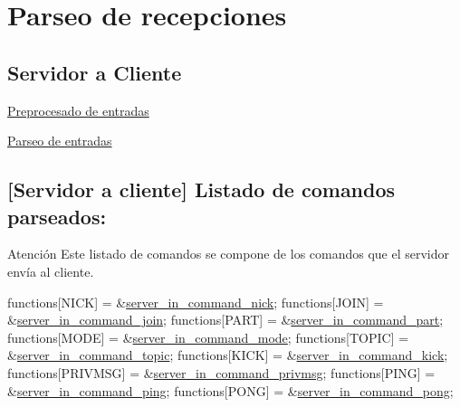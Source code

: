 \section*{Parseo de recepciones}

\subsection*{Servidor a Cliente}


\begin{DoxyItemize}
\item \hyperlink{client_pre_in_function}{Preprocesado de entradas} 
\item \hyperlink{client_execute_in_function}{Parseo de entradas} 
\end{DoxyItemize}\subsection*{\mbox{[}Servidor a cliente\mbox{]} Listado de comandos parseados\+:}

\begin{DoxyWarning}{Atención}
Este listado de comandos se compone de los comandos que el servidor envía al cliente.
\end{DoxyWarning}

\begin{DoxyCode}
functions[NICK]             = &\hyperlink{G-2313-06-P2__client__function__handlers_8h_a3271de16b2f7077059343bd6f52e4866}{server\_in\_command\_nick};
functions[JOIN]             = &\hyperlink{G-2313-06-P2__client__function__handlers_8h_a64c324e32edf01774722861d3abc7be3}{server\_in\_command\_join};
functions[PART]             = &\hyperlink{G-2313-06-P2__client__function__handlers_8h_a53568ffb9d2301140815861c2f7178ad}{server\_in\_command\_part};
functions[MODE]             = &\hyperlink{G-2313-06-P2__client__function__handlers_8h_ae5f66619469f8ea0efa0a7a5d75938dc}{server\_in\_command\_mode};
functions[TOPIC]            = &\hyperlink{G-2313-06-P2__client__function__handlers_8h_ad908abfd32d53b9483d5afa4ca18ff14}{server\_in\_command\_topic};
functions[KICK]             = &\hyperlink{G-2313-06-P2__client__function__handlers_8h_aa3d18c616914957b9794f086466788bb}{server\_in\_command\_kick};
functions[PRIVMSG]          = &\hyperlink{G-2313-06-P2__client__function__handlers_8h_a32594eebe5482f63993568825a9e126a}{server\_in\_command\_privmsg};
functions[PING]             = &\hyperlink{G-2313-06-P2__client__function__handlers_8h_a09a9d4d13037bd783036a70d5a76ac46}{server\_in\_command\_ping};
functions[PONG]             = &\hyperlink{G-2313-06-P2__client__function__handlers_8h_a06042a6459e89e0ae7586e66f8595fa3}{server\_in\_command\_pong};
\end{DoxyCode}
 ~\newline
